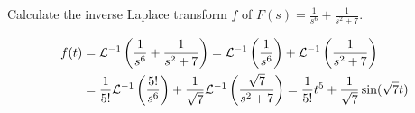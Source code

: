 \documentclass[notes]{subfiles}
\begin{document}
\begin{exercise}
    Calculate the inverse Laplace transform $f$ of $F(s) = \frac{1}{s^6} + \frac{1}{s^2 + 7}$.
\end{exercise}
\begin{solution}
    \begin{align*}
        f(t)
        &= \mathcal{L} ^{-1}\left(\frac{1}{s^6} + \frac{1}{s^2 + 7}\right)
        = \mathcal{L} ^{-1}\left(\frac{1}{s^6}\right) + \mathcal{L} ^{-1}\left(\frac{1}{s^2 + 7}\right) \\
        &= \frac{1}{5!}\mathcal{L} ^{-1}\left(\frac{5!}{s^6}\right) + \frac{1}{\sqrt{7}}\mathcal{L} ^{-1}\left(\frac{\sqrt{7}}{s^2 + 7}\right)
        = \frac{1}{5!}t^5 + \frac{1}{\sqrt{7}}\sin(\sqrt{7}t)
    \end{align*}
\end{solution}
\end{document}
